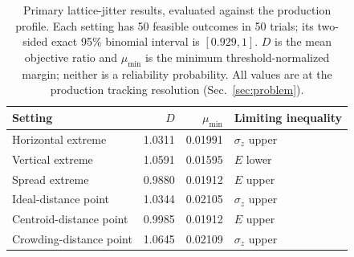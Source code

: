 \begin{table}[htbp]
\centering
\caption{Primary lattice-jitter results, evaluated against the production profile. Each setting
has 50 feasible outcomes in 50 trials; its two-sided exact 95\% binomial interval is
$[0.929,1]$. $D$ is the mean objective ratio and $\mu_{\min}$ is the minimum
threshold-normalized margin; neither is a reliability probability. All values are at the production tracking resolution (Sec.~\ref{sec:problem}).}
\label{tab:robustness_summary}
\begin{tabular}{lrrl}\toprule
Setting & $D$ & $\mu_{\min}$ & Limiting inequality \\\midrule
Horizontal extreme & 1.0311 & 0.01991 & $\sigma_z$ upper \\
Vertical extreme & 1.0591 & 0.01595 & $E$ lower \\
Spread extreme & 0.9880 & 0.01912 & $E$ upper \\
Ideal-distance point & 1.0344 & 0.02105 & $\sigma_z$ upper \\
Centroid-distance point & 0.9985 & 0.01912 & $E$ upper \\
Crowding-distance point & 1.0645 & 0.02109 & $\sigma_z$ upper \\
\bottomrule\end{tabular}\end{table}
